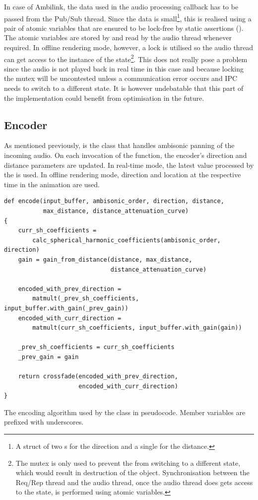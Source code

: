 In case of Ambilink, the data used in the audio processing callback has to be passed from the Pub/Sub thread.
Since the data is small\footnote{
    A struct of two s for the direction and a single  for the distance.
}, 
this is realised using a pair of atomic variables that are ensured to be lock-free
by static assertions (). The atomic variables are stored by 
 and read by the audio thread whenever required.
In offline rendering mode, however, a lock is utilised so the audio thread can get access 
to the instance of the  state\footnote{
    The mutex is only used to prevent the  from switching to a different state,
    which would result in destruction of the  object.
    Synchronisation between the Req/Rep thread and the audio thread,
    once the audio thread does gets access to the state, is performed using 
    atomic variables.
}. This does not really pose a problem since the audio 
is not played back in real time in this case and because locking the mutex
will be uncontested unless a communication error occurs and IPC needs to switch to a different state.
It is however undebatable that this part of the implementation could benefit from optimisation in the future.

\subsection{Encoder}
As mentioned previously,  is the class that handles ambisonic panning of the incoming audio. 
On each invocation of the  function, the encoder's 
direction and distance parameters are updated. In real-time mode, the latest value processed by the  is used.
In offline rendering mode, direction and location at the respective time in the animation are used.

\begin{listing}[ht]
\begin{verbatim}
def encode(input_buffer, ambisonic_order, direction, distance, 
           max_distance, distance_attenuation_curve)
{
    curr_sh_coefficients = 
        calc_spherical_harmonic_coefficients(ambisonic_order, direction)
    gain = gain_from_distance(distance, max_distance, 
                              distance_attenuation_curve)

    encoded_with_prev_direction =
        matmult(_prev_sh_coefficients, input_buffer.with_gain(_prev_gain))
    encoded_with_curr_direction = 
        matmult(curr_sh_coefficients, input_buffer.with_gain(gain))

    _prev_sh_coefficients = curr_sh_coefficients
    _prev_gain = gain

    return crossfade(encoded_with_prev_direction,
                     encoded_with_curr_direction)
}
\end{verbatim}
\caption{The encoding algorithm used by the  class in pseudocode. Member variables are prefixed with underscores.}
\label{pseudocode:encoding_algo}
\end{listing}

